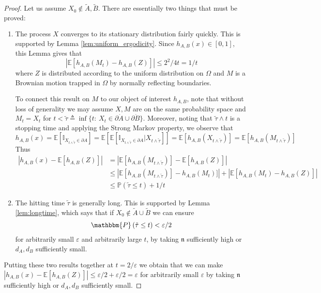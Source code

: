 \documentclass[english, aip, jcp, priprint, graphicx,floatfix]{revtex4-1}
\theoremstyle{plain}
\theoremstyle{definition}
\theoremstyle{plain}
\newcommand{\dimension}{{\mathfrak{n}}}
\newcommand{\indicatorf}[1]{\mathbb{I}_{#1}}
\begin{document}
\begin{proof}
Let us assume $X_0 \notin \tilde A,\tilde B$.  There are essentially two things that must be proved:
\begin{enumerate}
\item The process $X$ converges to its stationary distribution fairly quickly.  This is supported by Lemma \ref{lem:uniform_ergodicity}.  Since $h_{A,B}(x) \in [0,1]$, this Lemma gives that
%
\[
|\mathbb{E}[h_{A,B}(M_t)-h_{A,B}(Z)]| \leq 2^2/4t =1/t
\]
%
where $Z$ is distributed according to the uniform distribution on $\Omega$ and $M$ is a Brownian motion trapped in $\Omega$ by normally reflecting boundaries.  

To connect this result on $M$ to our object of interest $h_{A,B}$, note that without loss of generality we may assume $X,M$ are on the same probability space and $M_t=X_t$ for $t<\tilde\tau \triangleq \inf \{t:\ X_t \in \partial \dot A \cup \partial \dot B\}$.  Moreover, noting that $\tilde\tau\wedge t$ is a stopping time and applying the Strong Markov property, we observe that 
%
\[
h_{A,B}(x) = \mathbb{E} [\indicatorf{X_{t\wedge\tilde\tau} \in \partial A}] 
        = \mathbb{E} [\mathbb{E}[\indicatorf{X_{t\wedge\tilde\tau} \in \partial A} | X_{t\wedge\tilde\tau}]]
        = \mathbb{E} [h_{A,B}(X_{t\wedge\tilde\tau})] = \mathbb{E} [h_{A,B}(M_{t\wedge\tilde\tau})]
\]
%
Thus
\begin{align*}
|h_{A,B}(x) - \mathbb{E}[h_{A,B}(Z)]| &= |\mathbb{E} [h_{A,B}(M_{t\wedge\tilde\tau})] - \mathbb{E}[h_{A,B}(Z)]|\\
&\leq |\mathbb{E} [h_{A,B}(M_{t\wedge\tilde\tau})] - h_{A,B}(M_t)]| + |\mathbb{E} [h_{A,B}(M_{t}) - h_{A,B}(Z)]|\\
&\leq \mathbb{P}(\tilde \tau \leq t) + 1/t
\end{align*}
%

\item The hitting time $\tilde \tau$ is generally long.  This is supported by Lemma \ref{lem:longtime}, which says that if $X_0 \not\in\tilde{A} \cup \tilde{B}$ we can ensure
%
\[
\mathbbm{P} \left( \tilde{\tau} \leq t \right) < \varepsilon/2
\]
%
for arbitrarily small $\varepsilon$ and arbitrarily large $t$, by taking $\dimension$ sufficiently high or $d_A,d_B$ sufficiently small.
\end{enumerate}
Putting these two results together at $t=2/\varepsilon$ we obtain that we can make $|h_{A,B}(x) - \mathbb{E}[h_{A,B}(Z)]| \leq \varepsilon / 2 + \varepsilon/2 = \varepsilon$ for arbitrarily small $\varepsilon$ by taking $\dimension$ sufficiently high or $d_A,d_B$ sufficiently small.
\end{proof}
\end{document}
